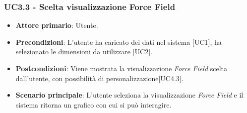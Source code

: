 \subsubsection{UC3.3 - Scelta visualizzazione Force Field}
\begin{itemize}
	\item \textbf{Attore primario}: Utente.
	\item \textbf{Precondizioni}: L'utente ha caricato dei dati nel sistema [UC1], ha selezionato le dimensioni da utilizzare [UC2].
	\item \textbf{Postcondizioni}: Viene mostrata la visualizzazione \textit{Force Field} scelta dall'utente, con possibilità di personalizzazione[UC4.3].
	\item \textbf{Scenario principale}: L'utente seleziona la visualizzazione \textit{Force Field} e il sistema ritorna un grafico con cui si può interagire.
\end{itemize}